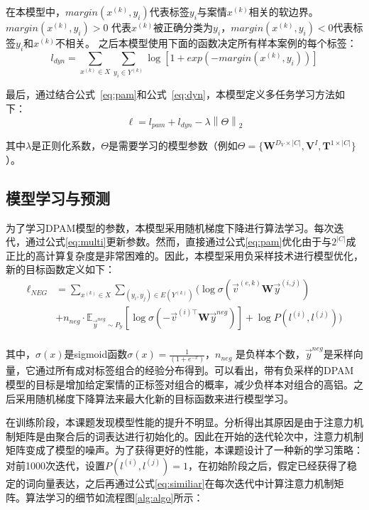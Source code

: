 在本模型中，$margin(x^{(k)},y_i)$代表标签$y_i$与案情$x^{(k)}$相关的软边界。$margin(x^{(k)},y_i)>0$ 代表$x^{(k)}$被正确分类为$y_i$，$margin(x^{(k)},y_i)<0$代表标签$y_i$和$x^{(k)}$不相关。
之后本模型使用下面的函数决定所有样本案例的每个标签：
\begin{equation}\label{eq:dyn}
l_{dyn}=\sum_{x^{(k)}\in X}\sum_{y_i\in Y^{(k)}}\log\left[1+exp(-margin(x^{(k)},y_i))\right]
\end{equation}

最后，通过结合公式~\ref{eq:pam}和公式~\ref{eq:dyn}，本模型定义多任务学习方法如下：
\begin{equation}\label{eq:multi}
\ell=l_{pam}+l_{dyn}-\lambda\left\|\Theta\right\|_2
\end{equation}

其中$\lambda$是正则化系数，$\Theta$是需要学习的模型参数（例如$\Theta=\{\textbf{W}^{D_V\times |C|},\textbf{V}^I,\textbf{T}^{1\times|C|}\}$）。

\subsection{模型学习与预测}
为了学习DPAM模型的参数，本模型采用随机梯度下降进行算法学习。每次迭代，通过公式\ref{eq:multi}更新参数。然而，直接通过公式\ref{eq:pam}优化由于与$2^{|C|}$成正比的高计算复杂度是非常困难的。因此，本模型采用负采样技术\cite{mikolov2013}进行模型优化，新的目标函数定义如下：
\begin{displaymath}
\begin{aligned}
\ell_{NEG} &= \sum_{x^{(k)}\in X}\sum_{(y_i,y_j)\in E(Y^{(k)})}\Big( \log\sigma(\vec{v}^{(e,k)}\textbf{W}\vec{y}^{(i,j)})\\
&+n_{neg}\cdot \mathbb{E}_{\vec{y}^{neg}\sim P_{\mathcal{Y}}}[\log\sigma(-\vec{v}^{(i)\top}\textbf{W}\vec{y}^{neg})]+\log P(l^{(i)},l^{(j)})\Big)\\
\end{aligned}
\end{displaymath}

其中，$\sigma(x)$是sigmoid函数$\sigma(x)=\frac{1}{(1+e^{-x})}$，$n_{neg}$ 是负样本个数，$\vec{y}^{neg}$是采样向量，它通过所有成对标签组合的经验分布得到。可以看出，带有负采样的DPAM模型的目标是增加给定案情的正标签对组合的概率，减少负样本对组合的高铝。之后采用随机梯度下降算法来最大化新的目标函数来进行模型学习。

在训练阶段，本课题发现模型性能的提升不明显。分析得出其原因是由于注意力机制矩阵是由聚合后的词表达进行初始化的。因此在开始的迭代轮次中，注意力机制矩阵变成了模型的噪声。为了获得更好的性能，本课题设计了一种新的学习策略：对前1000次迭代，设置$P(l^{(i)},l^{(j)})=1$，在初始阶段之后，假定已经获得了稳定的词向量表达，之后再通过公式\ref{eq:similiar}在每次迭代中计算注意力机制矩阵。算法学习的细节如流程图\ref{alg:algo}所示：

